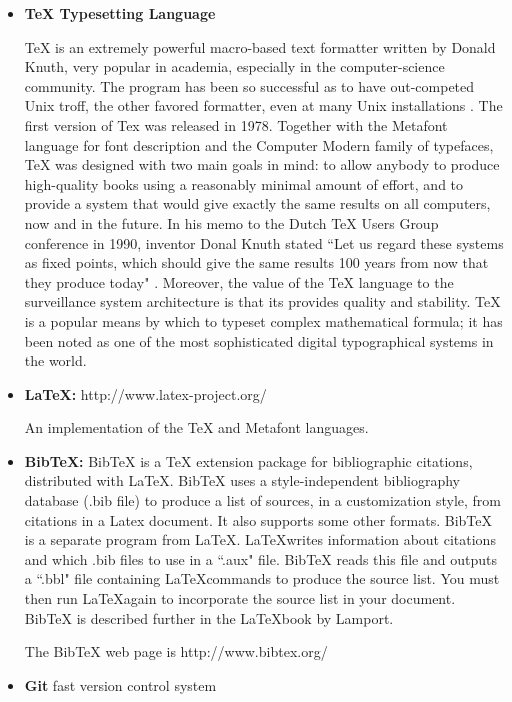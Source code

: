 \documentclass[12pt,letterpaper]{report}
\begin{document}
\begin{itemize}
\item \textbf{{\TeX} Typesetting Language}

TeX is an extremely powerful macro-based text formatter written by Donald Knuth, very popular in academia, especially in the computer-science community. The program has been so successful as to have out-competed Unix troff, the other favored formatter, even at many Unix installations \cite{howe2010foldoc}.  The first version of Tex was released in 1978.  Together with the Metafont language for font description and the Computer Modern family of typefaces, TeX was designed with two main goals in mind: to allow anybody to produce high-quality books using a reasonably minimal amount of effort, and to provide a system that would give exactly the same results on all computers, now and in the future. \cite{gaudeul2007open}
In his memo to the Dutch TeX Users Group conference in 1990, inventor Donal Knuth stated ``Let us regard these systems as fixed points, which should give the same results 100 years from now that they produce today" \cite{Knuth1990TFoTex}. Moreover, the value of the TeX language to the surveillance system architecture is that its provides quality and stability.
TeX is a popular means by which to typeset complex mathematical formula; it has been noted as one of the most sophisticated digital typographical systems in the world. \cite{gaudeul2007open}

\item \textbf{{\LaTeX}:} http://www.latex-project.org/

An implementation of the TeX and Metafont languages.

\item \textbf{Bib{\TeX}:}
Bib{\TeX} is a TeX extension package for bibliographic citations, distributed with \LaTeX. BibTeX uses a style-independent bibliography database (.bib file) to produce a list of sources, in a customization style, from citations in a Latex document. It also supports some other formats. 
Bib{\TeX} is a separate program from \LaTeX. \LaTeX  writes information about citations and which .bib files to use in a ``.aux" file. Bib{\TeX} reads this file and outputs a ``.bbl" file containing \LaTeX  commands to produce the source list. You must then run \LaTeX again to incorporate the source list in your document. Bib{\TeX} is described further in the \LaTeX book by Lamport. \cite{howe2010foldoc}

The BibTeX web page is http://www.bibtex.org/

\item \textbf{Git} fast version control system \cite{chacon2009pro}


\end{itemize}
\end{document}
